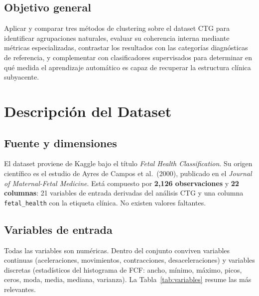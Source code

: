 \documentclass[12pt,letterpaper]{article}
\begin{document}
\subsection{Objetivo general}

Aplicar y comparar tres métodos de clustering sobre el dataset CTG para identificar
agrupaciones naturales, evaluar su coherencia interna mediante métricas especializadas,
contrastar los resultados con las categorías diagnósticas de referencia, y complementar
con clasificadores supervisados para determinar en qué medida el aprendizaje automático
es capaz de recuperar la estructura clínica subyacente.

\section{Descripción del Dataset}

\subsection{Fuente y dimensiones}

El dataset proviene de Kaggle bajo el título \textit{Fetal Health Classification}. Su origen
científico es el estudio de Ayres de Campos et al.\ (2000), publicado en el
\textit{Journal of Maternal-Fetal Medicine}. Está compuesto por \textbf{2{,}126 observaciones}
y \textbf{22 columnas}: 21 variables de entrada derivadas del análisis CTG y una columna
\texttt{fetal\_health} con la etiqueta clínica. No existen valores faltantes.

\subsection{Variables de entrada}

Todas las variables son numéricas. Dentro del conjunto conviven variables continuas
(aceleraciones, movimientos, contracciones, desaceleraciones) y variables discretas
(estadísticos del histograma de FCF: ancho, mínimo, máximo, picos, ceros, moda, media,
mediana, varianza). La Tabla~\ref{tab:variables} resume las más relevantes.
\end{document}
